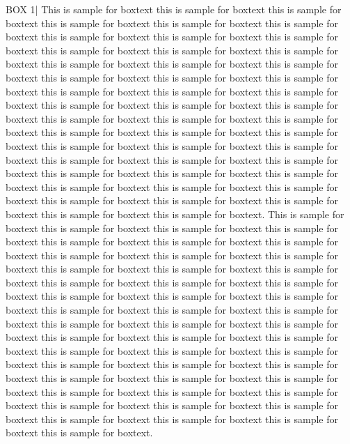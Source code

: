 \documentclass[ASNA,twocolumn]{USG} %
\begin{document}
\begin{boxwithhead}
{BOX 1\quad|}
{\noindent This is sample for boxtext this is sample for boxtext this is sample for boxtext this is sample for boxtext this is sample for boxtext this is sample for boxtext this is sample for boxtext this is sample for boxtext this is sample for boxtext this is sample for boxtext this is sample for boxtext this is sample for boxtext this is sample for boxtext this is sample for boxtext this is sample for boxtext this is sample for boxtext this is sample for boxtext this is sample for boxtext this is sample for boxtext this is sample for boxtext this is sample for boxtext this is sample for boxtext this is sample for boxtext this is sample for boxtext this is sample for boxtext this is sample for boxtext this is sample for boxtext this is sample for boxtext this is sample for boxtext this is sample for boxtext this is sample for boxtext this is sample for boxtext this is sample for boxtext this is sample for boxtext this is sample for boxtext this is sample for boxtext this is sample for boxtext this is sample for boxtext this is sample for boxtext this is sample for boxtext this is sample for boxtext this is sample for boxtext this is sample for boxtext this is sample for boxtext this is sample for boxtext this is sample for boxtext this is sample for boxtext. This is sample for boxtext this is sample for boxtext this is sample for boxtext this is sample for boxtext this is sample for boxtext this is sample for boxtext this is sample for boxtext this is sample for boxtext this is sample for boxtext this is sample for boxtext this is sample for boxtext this is sample for boxtext this is sample for boxtext this is sample for boxtext this is sample for boxtext this is sample for boxtext this is sample for boxtext this is sample for boxtext this is sample for boxtext this is sample for boxtext this is sample for boxtext this is sample for boxtext this is sample for boxtext this is sample for boxtext this is sample for boxtext this is sample for boxtext this is sample for boxtext this is sample for boxtext this is sample for boxtext this is sample for boxtext this is sample for boxtext this is sample for boxtext this is sample for boxtext this is sample for boxtext this is sample for boxtext this is sample for boxtext this is sample for boxtext this is sample for boxtext this is sample for boxtext this is sample for boxtext this is sample for boxtext this is sample for boxtext this is sample for boxtext this is sample for boxtext this is sample for boxtext this is sample for boxtext this is sample for boxtext.}
\end{boxwithhead}
\end{document}
